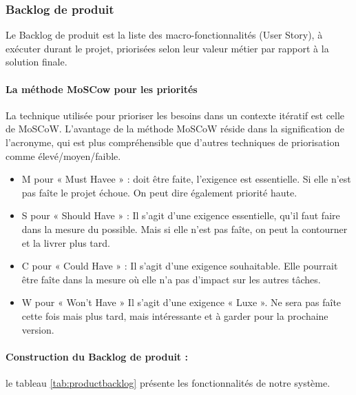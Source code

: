  \subsubsection{Backlog de produit}
Le Backlog de produit est la liste des macro-fonctionnalités (User Story), à exécuter durant le projet, priorisées selon leur valeur métier par rapport à la solution finale.
\paragraph{La méthode MoSCow pour les priorités}
La technique utilisée pour prioriser les besoins dans un contexte itératif est celle de MoSCoW. L'avantage de la méthode MoSCoW réside dans la signification de l'acronyme, qui est plus compréhensible que d'autres techniques de priorisation comme élevé/moyen/faible.
\begin{itemize}
    \item M pour « Must Havee » : doit être faite, l’exigence est essentielle. Si elle n’est pas faîte le projet échoue. On peut dire également priorité haute.
    \item S pour « Should Have » : Il s’agit d’une exigence essentielle, qu’il faut faire dans la mesure du possible. Mais si elle n’est pas faîte, on peut la contourner et la livrer plus tard.
    \item C pour « Could Have » : Il s’agit d’une exigence souhaitable. Elle pourrait être faîte dans la mesure où elle n’a pas d’impact sur les autres tâches.
    \item W pour « Won't Have » Il s’agit d’une exigence « Luxe ». Ne sera pas faîte cette fois mais plus tard, mais intéressante et à garder pour la prochaine version.
\end{itemize}

\paragraph{Construction du Backlog de produit :}

le tableau \ref{tab:productbacklog} présente les fonctionnalités de notre système.

